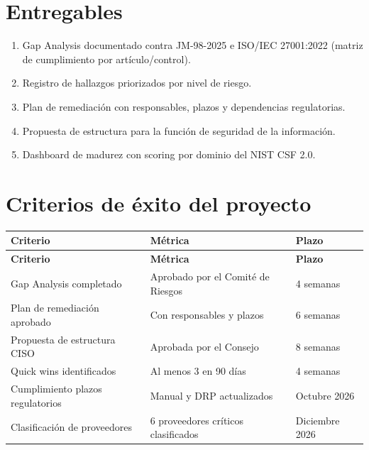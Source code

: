 \documentclass[11pt,a4paper]{article}
\begin{document}
	\section{Entregables}
	
	\begin{enumerate}[leftmargin=1.5em]
		\item Gap Analysis documentado contra JM-98-2025 e ISO/IEC 27001:2022 (matriz de cumplimiento por artículo/control).
		\item Registro de hallazgos priorizados por nivel de riesgo.
		\item Plan de remediación con responsables, plazos y dependencias regulatorias.
		\item Propuesta de estructura para la función de seguridad de la información.
		\item Dashboard de madurez con scoring por dominio del NIST CSF 2.0.
	\end{enumerate}
	
	
	\section{Criterios de éxito del proyecto}
	
	\begin{longtable}{@{}p{6cm}p{6cm}p{3cm}@{}}
		\toprule
		\textbf{Criterio} & \textbf{Métrica} & \textbf{Plazo} \\ \midrule
		\endfirsthead
		\toprule
		\textbf{Criterio} & \textbf{Métrica} & \textbf{Plazo} \\ \midrule
		\endhead
		Gap Analysis completado & Aprobado por el Comité de Riesgos & 4 semanas \\
		Plan de remediación aprobado & Con responsables y plazos & 6 semanas \\
		Propuesta de estructura CISO & Aprobada por el Consejo & 8 semanas \\
		Quick wins identificados & Al menos 3 en 90 días & 4 semanas \\
		Cumplimiento plazos regulatorios & Manual y DRP actualizados & Octubre 2026 \\
		Clasificación de proveedores & 6 proveedores críticos clasificados & Diciembre 2026 \\ \bottomrule
	\end{longtable}
	
\end{document}
